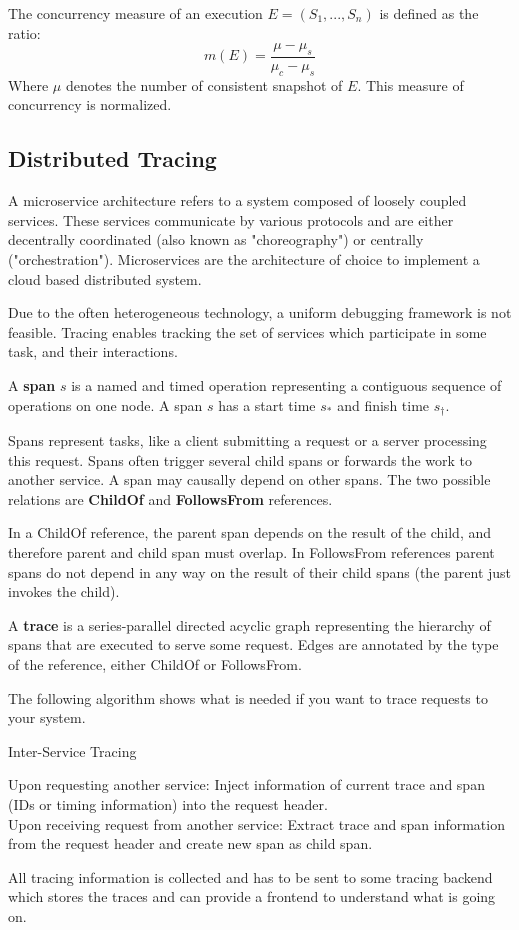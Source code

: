 The concurrency measure of an execution $E = (S_1, ..., S_n)$ is defined as the ratio:
$$m(E) = \frac{\mu - \mu_s}{\mu_c - \mu_s}$$
Where $\mu$ denotes the number of consistent snapshot of $E$. This measure of concurrency is normalized.


\subsection{Distributed Tracing}

A microservice architecture refers to a system composed of loosely coupled services. These services communicate by various protocols and are either decentrally coordinated (also known as "choreography") or centrally ("orchestration"). Microservices are the architecture of choice to implement a cloud based distributed system. \medskip

Due to the often heterogeneous technology, a uniform debugging framework is not feasible. Tracing enables tracking the set of services which participate in some task, and their interactions. \medskip

A \textbf{span} $s$ is a named and timed operation representing a contiguous sequence of operations on one node. A span $s$ has a start time $s_*$ and finish time $s_\dagger$. \medskip

Spans represent tasks, like a client submitting a request or a server processing this request. Spans often trigger several child spans or forwards the work to another service. A span may causally depend on other spans. The two possible relations are \textbf{ChildOf} and \textbf{FollowsFrom} references.\medskip

In a ChildOf reference, the parent span depends on the result of the child, and therefore parent and child span must overlap. In FollowsFrom references parent spans do not depend in any way on the result of their child spans (the parent just invokes the child). \medskip

A \textbf{trace} is a series-parallel directed acyclic graph representing the hierarchy of spans that are executed to serve some request. Edges are annotated by the type of the reference, either ChildOf or FollowsFrom. \medskip

The following algorithm shows what is needed if you want to trace requests to your system.\medskip

\begin{algorithm}[H]
\caption{Inter-Service Tracing}
	Upon requesting another service: Inject information of current trace and span (IDs or timing information) into the request header. \\
	\BlankLine
	Upon receiving request from another service: Extract trace and span information from the request header and create new span as child span.
\end{algorithm}
\medskip

All tracing information is collected and has to be sent to some tracing backend which stores the traces and can provide a frontend to understand what is going on.
